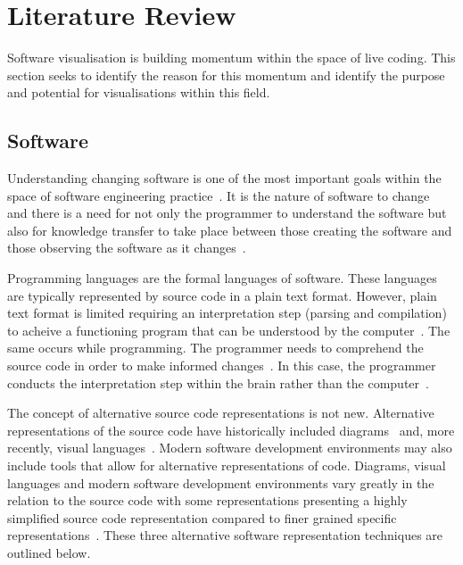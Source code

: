 
\chapter{Literature Review}

Software visualisation is building momentum within the space of live coding. This section seeks to identify the reason for this momentum and identify the purpose and potential for visualisations within this field.


\section{Software}

Understanding changing software is one of the most important goals within the space of software engineering practice~\cite{Tao2012}. It is the nature of software to change~\cite{Purushothaman2005} and there is a need for not only the programmer to understand the software but also for knowledge transfer to take place between those creating the software and those observing the software as it changes~.

Programming languages are the formal languages of software. These languages are typically represented by source code in a plain text format. However, plain text format is limited requiring an interpretation step (parsing and compilation) to acheive a functioning program that can be understood by the computer~\cite{Badros2000}. The same occurs while programming. The programmer needs to comprehend the source code in order to make informed changes~. In this case, the programmer conducts the interpretation step within the brain rather than the computer~.

The concept of alternative source code representations is not new. Alternative representations of the source code have historically included diagrams~ and, more recently, visual languages~. Modern software development environments may also include tools that allow for alternative representations of code. Diagrams, visual languages and modern software development environments vary greatly in the relation to the source code with some representations presenting a highly simplified source code representation compared to finer grained specific representations~. These three alternative software representation techniques are outlined below.


